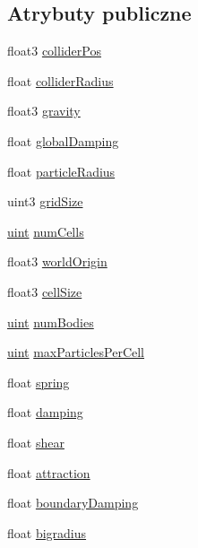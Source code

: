 \subsection*{Atrybuty publiczne}
\begin{DoxyCompactItemize}
\item 
float3 \hyperlink{struct_sim_params_aa27be265020f137f0a9cfbc3f1d2d9f8}{collider\-Pos}
\item 
float \hyperlink{struct_sim_params_a06ca2162f6f0aec08343db6ed8cd4478}{collider\-Radius}
\item 
float3 \hyperlink{struct_sim_params_ae7508eba5dd90859215b59d19e001bb9}{gravity}
\item 
float \hyperlink{struct_sim_params_a7058bad8c867d9d42d8c9d842638ebea}{global\-Damping}
\item 
float \hyperlink{struct_sim_params_a7e131c24e1020c44173deb0f57a8c4af}{particle\-Radius}
\item 
uint3 \hyperlink{struct_sim_params_a4cfb18ff777876da3ad69aae6e023949}{grid\-Size}
\item 
\hyperlink{particles__kernel_8cuh_a91ad9478d81a7aaf2593e8d9c3d06a14}{uint} \hyperlink{struct_sim_params_a9d51112b7e86d46b6f33126a67cc84b4}{num\-Cells}
\item 
float3 \hyperlink{struct_sim_params_a1ed7465773f15f2874650f19cec3d0a9}{world\-Origin}
\item 
float3 \hyperlink{struct_sim_params_ad5d71ad4ba6acc829a35f47b3da3e169}{cell\-Size}
\item 
\hyperlink{particles__kernel_8cuh_a91ad9478d81a7aaf2593e8d9c3d06a14}{uint} \hyperlink{struct_sim_params_adb68e9ee2422208807756b367efdf842}{num\-Bodies}
\item 
\hyperlink{particles__kernel_8cuh_a91ad9478d81a7aaf2593e8d9c3d06a14}{uint} \hyperlink{struct_sim_params_a557e8042b00135073cd51fabf4594142}{max\-Particles\-Per\-Cell}
\item 
float \hyperlink{struct_sim_params_a301314921adc7bce20d8955cf03cdf3f}{spring}
\item 
float \hyperlink{struct_sim_params_abf1644c671e60ebaf873d9167e755328}{damping}
\item 
float \hyperlink{struct_sim_params_ad48210724ada15a14a649b25ad61575b}{shear}
\item 
float \hyperlink{struct_sim_params_acf7442ae8a49237861944271cb630d01}{attraction}
\item 
float \hyperlink{struct_sim_params_a4da0c7593d6569e48ee50e7d0c7576f9}{boundary\-Damping}
\item 
float \hyperlink{struct_sim_params_af41979948fdd8f76fe28ce2b43eb24cd}{bigradius}
\end{DoxyCompactItemize}


